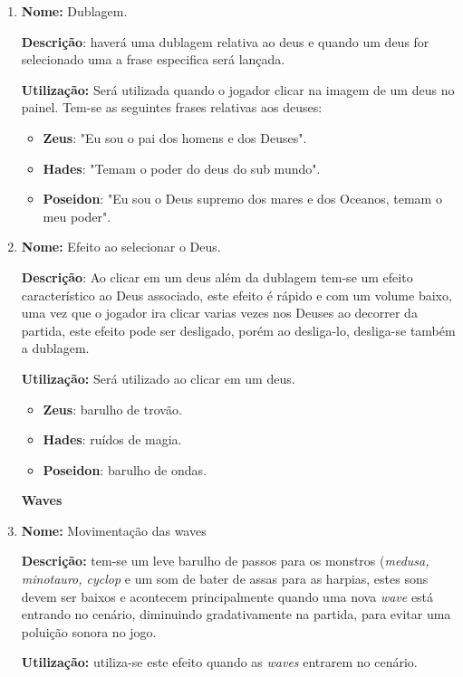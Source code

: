 \documentclass[11pt]{article} %
\begin{document}
\begin{enumerate}
\item 
\textbf{Nome:} Dublagem. 

\textbf{Descrição}: haverá uma dublagem relativa ao deus e quando um deus for selecionado uma a frase especifica será lançada.

\textbf{Utilização:} Será utilizada quando o jogador clicar na imagem de um deus no painel. Tem-se as seguintes frases relativas aos deuses:
\begin{itemize}
\item \textbf{Zeus}: "Eu sou o pai dos homens e dos Deuses".
\item \textbf{Hades}: "Temam o poder do deus do sub mundo".
\item \textbf{Poseidon}: "Eu sou o Deus supremo dos mares e dos Oceanos, temam o meu poder".
\end{itemize}

\item
\textbf{Nome:} Efeito ao selecionar o Deus.

\textbf{Descrição}: Ao clicar em um deus além da dublagem tem-se um efeito característico ao Deus associado, este efeito é rápido e com um volume baixo, uma vez que o jogador ira clicar varias vezes nos Deuses ao decorrer da partida, este efeito pode ser desligado, porém ao desliga-lo, desliga-se também a dublagem.

\textbf{Utilização:} Será utilizado ao clicar em um deus.
\begin{itemize}
\item \textbf{Zeus}: barulho de trovão.
\item \textbf{Hades}: ruídos de magia.
\item \textbf{Poseidon}: barulho de ondas.
\end{itemize}

\begin{LARGE}
\textbf{Waves}

\end{LARGE}
\item
\textbf{Nome:} Movimentação das waves

\textbf{Descrição:} tem-se um leve barulho de passos para os monstros (\textit{medusa, minotauro, cyclop} e um som de bater de assas para as harpias, estes sons devem ser baixos e acontecem principalmente quando uma nova \textit{wave} está entrando no cenário, diminuindo gradativamente na partida, para evitar uma poluição sonora no jogo.  

\textbf{Utilização:} utiliza-se este efeito quando as \textit{waves} entrarem no cenário.


\end{enumerate}
\end{document}
